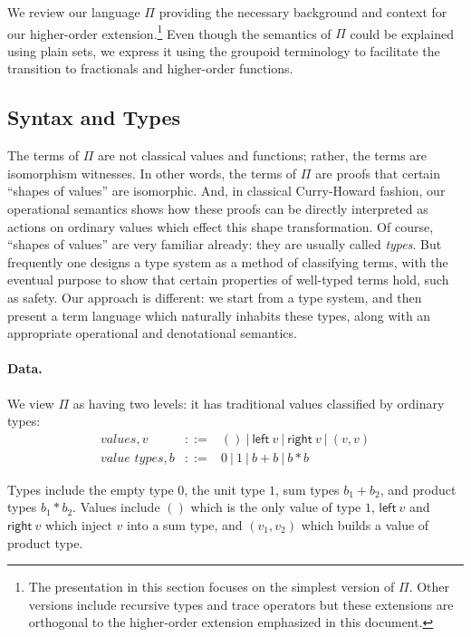 \documentclass[11pt]{article}
\newcommand{\alt}{~|~}
\newcommand{\leftv}[1]{\textsf{left}~#1}
\newcommand{\rightv}[1]{\textsf{right}~#1}
\begin{document}
We review our language $\Pi$ providing the necessary background and context
for our higher-order extension.\footnote{The presentation in this section
  focuses on the simplest version of $\Pi$. Other versions include recursive
  types and trace operators but these extensions are orthogonal to the
  higher-order extension emphasized in this document.} Even though the
semantics of $\Pi$ could be explained using plain sets, we express it using
the groupoid terminology to facilitate the transition to fractionals and
higher-order functions. 

\subsection{Syntax and Types} 

The terms of $\Pi$ are not classical values and functions; rather, the terms
are isomorphism witnesses.  In other words, the terms of $\Pi$ are proofs
that certain ``shapes of values'' are isomorphic.  And, in classical
Curry-Howard fashion, our operational semantics shows how these proofs can be
directly interpreted as actions on ordinary values which effect this shape
transformation. Of course, ``shapes of values'' are very familiar already:
they are usually called \emph{types}.  But frequently one designs a type
system as a method of classifying terms, with the eventual purpose to show
that certain properties of well-typed terms hold, such as safety.  Our
approach is different: we start from a type system, and then present a term
language which naturally inhabits these types, along with an appropriate
operational and denotational semantics.

\paragraph*{Data.}
We view $\Pi$ as having two levels: it has traditional values classified by
ordinary types:
\[\begin{array}{rcl} 
\textit{values}, v &::=& () \alt \leftv{v} \alt \rightv{v} \alt (v,v) \\
\textit{value types}, b &::=& 0 \alt 1 \alt b+b \alt b * b
\end{array}\]

Types include the empty type $0$, the unit type $1$, sum types $b_1+b_2$, and
product types $b_1*b_2$.  Values include $()$ which is the only value of type
$1$, $\leftv{v}$ and $\rightv{v}$ which inject $v$ into a sum type, and
$(v_1,v_2)$ which builds a value of product type.
\end{document}
